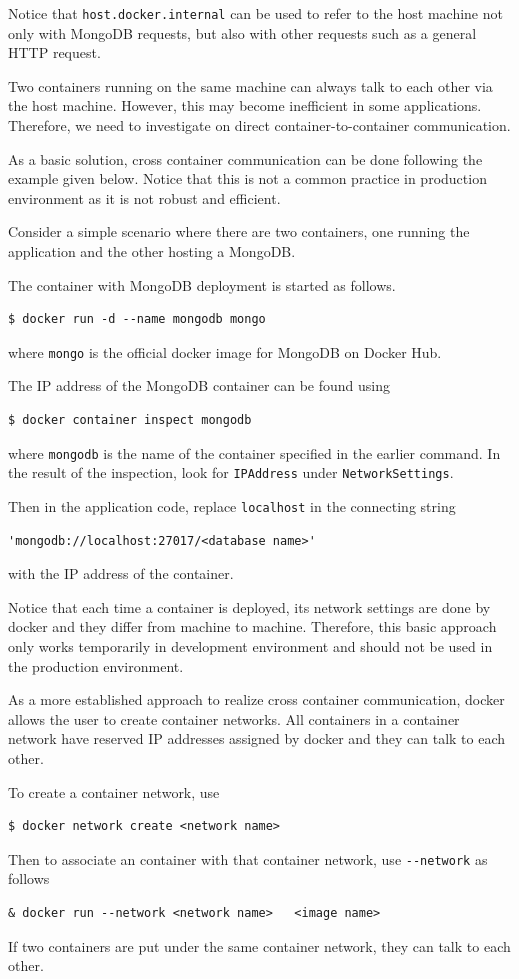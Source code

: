 Notice that \verb|host.docker.internal| can be used to refer to the host machine not only with MongoDB requests, but also with other requests such as a general HTTP request.

Two containers running on the same machine can always talk to each other via the host machine. However, this may become inefficient in some applications. Therefore, we need to investigate on direct container-to-container communication.

As a basic solution, cross container communication can be done following the example given below. Notice that this is not a common practice in production environment as it is not robust and efficient.

Consider a simple scenario where there are two containers, one running the application and the other hosting a MongoDB. 

The container with MongoDB deployment is started as follows.
\begin{lstlisting}
$ docker run -d --name mongodb mongo 	
\end{lstlisting}
where \verb|mongo| is the official docker image for MongoDB on Docker Hub.

The IP address of the MongoDB container can be found using
\begin{lstlisting}
$ docker container inspect mongodb	
\end{lstlisting}
where \verb|mongodb| is the name of the container specified in the earlier command. In the result of the inspection, look for \verb|IPAddress| under \verb|NetworkSettings|.

Then in the application code, replace \verb|localhost| in the connecting string
\begin{lstlisting}
'mongodb://localhost:27017/<database name>'	
\end{lstlisting}
with the IP address of the container.

Notice that each time a container is deployed, its network settings are done by docker and they differ from machine to machine. Therefore, this basic approach only works temporarily in development environment and should not be used in the production environment.

As a more established approach to realize cross container communication, docker allows the user to create container networks. All containers in a container network have reserved IP addresses assigned by docker and they can talk to each other.

To create a container network, use
\begin{lstlisting}
$ docker network create <network name>
\end{lstlisting}
Then to associate an container with that container network, use \verb|--network| as follows
\begin{lstlisting}
& docker run --network <network name>	<image name>
\end{lstlisting}
If two containers are put under the same container network, they can talk to each other. 

